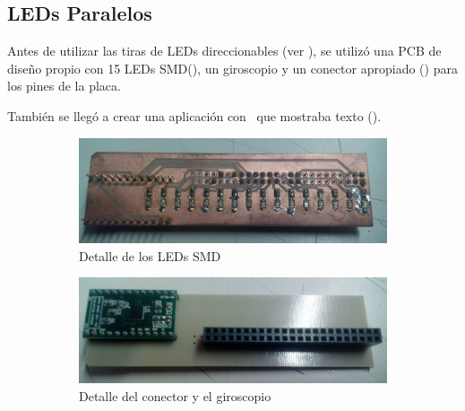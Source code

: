 \newpage
\subsection{LEDs Paralelos}
\label{sec:leds_paralelos}
Antes de utilizar las tiras de LEDs direccionables (ver
), se utilizó una PCB de diseño propio con 15
LEDs SMD(), un giroscopio y un conector
apropiado () para los pines de la placa.

También se llegó a crear una aplicación con \uCOS\ que mostraba texto
().

\begin{figure}[!ht]
	\centering
	\begin{subfigure}[t]{0.4\textwidth}
		\centering
		\includegraphics[width=\textwidth]{images/ledsParalelos-front}
		\caption{Detalle de los LEDs SMD}
		\label{fig:ledsParalelos-front}
	\end{subfigure}
	\hspace{0.5cm}
	\begin{subfigure}[t]{0.4\textwidth}
		\centering
		\includegraphics[width=\textwidth]{images/ledsParalelos-back}
		\caption{Detalle del conector y el giroscopio}
		\label{fig:ledsParalelos-back}
	\end{subfigure}
	\\
	\begin{subfigure}[t]{0.3\textwidth}
		\centering

\end{subfigure}
\end{figure}
